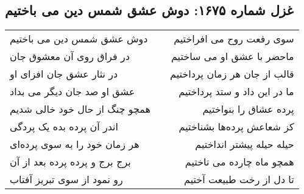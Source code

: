 \begin{center}
\section*{غزل شماره ۱۶۷۵: دوش عشق شمس دین می باختیم}
\label{sec:1675}
\begin{longtable}{l p{0.5cm} r}
دوش عشق شمس دین می باختیم
&&
سوی رفعت روح می افراختیم
\\
در فراق روی آن معشوق جان
&&
ماحضر با عشق او می ساختیم
\\
در نثار عشق جان افزای او
&&
قالب از جان هر زمان پرداختیم
\\
عشق او صد جان دیگر می بداد
&&
ما در این داد و ستد پرداختیم
\\
همچو چنگ از حال خود خالی شدیم
&&
پرده عشاق را بنواختیم
\\
اندر آن پرده بده یک پردگی
&&
کز شعاعش پرده‌ها بشناختیم
\\
هر زمان خود را به سوی پرده‌ای
&&
حیله حیله پیشتر انداختیم
\\
برج برج و پرده پرده بعد از آن
&&
همچو ماه چارده می تاختیم
\\
رو نمود از سوی تبریز آفتاب
&&
تا دل از رخت طبیعت آختیم
\\
\end{longtable}
\end{center}
